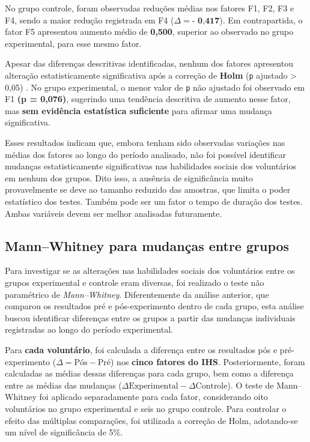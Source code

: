       No grupo controle, foram observadas reduções médias nos fatores F1, F2, F3 e F4, sendo a maior redução registrada em F4 ($\Delta = \textbf{- 0,417}$). Em contrapartida, o fator F5 apresentou aumento médio de \textbf{0,500}, superior ao observado no grupo experimental, para esse mesmo fator.

      Apesar das diferenças descritivas identificadas, nenhum dos fatores apresentou alteração estatisticamente significativa após a correção de \textbf{Holm}  (\texttt{p} ajustado > 0,05) \cite{Holm1979}. No grupo experimental, o menor valor de \texttt{p} não ajustado foi observado em F1 \textbf{(p = 0,076)}, sugerindo uma tendência descritiva de aumento nesse fator, mas \textbf{sem evidência estatística suficiente} para afirmar uma mudança significativa.

      Esses resultados indicam que, embora tenham sido observadas variações nas médias dos fatores ao longo do período analisado, não foi possível identificar mudanças estatisticamente significativas nas habilidades sociais dos voluntários em nenhum dos grupos. Dito isso, a ausência de significância muito provavelmente se deve ao tamanho reduzido das amostras, que limita o poder estatístico dos testes. Também pode ser um fator o tempo de duração dos testes. Ambas variáveis devem ser melhor analisadas futuramente.

    \subsection{Mann–Whitney para mudanças entre grupos}
      Para investigar se as alterações nas habilidades sociais dos voluntários entre os grupos experimental e controle eram diversas, foi realizado o teste não paramétrico de \textit{Mann–Whitney}. Diferentemente da análise anterior, que comparou os resultados pré e pós-experimento dentro de cada grupo, esta análise buscou identificar diferenças entre os grupos a partir das mudanças individuais registradas ao longo do período experimental.

      Para \textbf{cada voluntário}, foi calculada a diferença entre os resultados pós e pré-experimento ($\Delta = \text{Pós} - \text{Pré}$) nos \textbf{cinco fatores do IHS}. Posteriormente, foram calculadas as médias dessas diferenças para cada grupo, bem como a diferença entre as médias das mudanças ($\Delta\text{Experimental} - \Delta\text{Controle}$). O teste de Mann–Whitney foi aplicado separadamente para cada fator, considerando oito voluntários no grupo experimental e seis no grupo controle. Para controlar o efeito das múltiplas comparações, foi utilizada a correção de Holm, adotando-se um nível de significância de 5\%.


